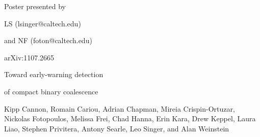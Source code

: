 \documentclass[portrait,plainboxedsections]{sciposter}
\begin{document}
\begin{minipage}[b]{0.25\textwidth}
\raggedleft
{\fontsize{36}{50}\selectfont
Poster presented by

LS (lsinger@caltech.edu)

and NF (foton@caltech.edu)

}
\vspace{32mm}
 
\fontsize{36}{40}\selectfont
arXiv:1107.2665
\end{minipage}%
\hspace{0.05\textwidth}%
\begin{minipage}[b]{0.6\textwidth}
{\fontsize{80}{100}\selectfont%
Toward early-warning detection

of compact binary coalescence

\vspace{0.5em}
\fontsize{30}{40}\selectfont
	Kipp Cannon,
	Romain Cariou,
	Adrian Chapman,
	Mireia Crispin-Ortuzar,
	Nickolas Fotopoulos,
	Melissa Frei,
	Chad Hanna,
	Erin Kara,
	Drew Keppel,
	Laura Liao,
	Stephen Privitera,
	Antony Searle,
	Leo Singer, and
	Alan Weinstein

}
\end{minipage}
\vspace{1cm}
\end{document}
